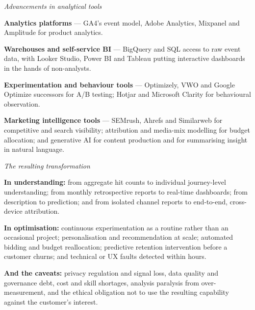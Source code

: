 \begin{qlist}
\textit{Advancements in analytical tools}
\begin{apts}\setcounter{enumi}{9}
\item \textbf{Analytics platforms} --- GA4's event model, Adobe Analytics,
      Mixpanel and Amplitude for product analytics.
\item \textbf{Warehouses and self-service BI} --- BigQuery and SQL access to
      raw event data, with Looker Studio, Power BI and Tableau putting
      interactive dashboards in the hands of non-analysts.
\item \textbf{Experimentation and behaviour tools} --- Optimizely, VWO and
      Google Optimize successors for A/B testing; Hotjar and Microsoft Clarity
      for behavioural observation.
\item \textbf{Marketing intelligence tools} --- SEMrush, Ahrefs and Similarweb
      for competitive and search visibility; attribution and media-mix
      modelling for budget allocation; and generative AI for content production
      and for summarising insight in natural language.
\end{apts}

\textit{The resulting transformation}
\begin{apts}\setcounter{enumi}{13}
\item \textbf{In understanding:} from aggregate hit counts to individual
      journey-level understanding; from monthly retrospective reports to
      real-time dashboards; from description to prediction; and from isolated
      channel reports to end-to-end, cross-device attribution.
\item \textbf{In optimisation:} continuous experimentation as a routine rather
      than an occasional project; personalisation and recommendation at scale;
      automated bidding and budget reallocation; predictive retention
      intervention before a customer churns; and technical or UX faults
      detected within hours.
\item \textbf{And the caveats:} privacy regulation and signal loss, data
      quality and governance debt, cost and skill shortages, analysis paralysis
      from over-measurement, and the ethical obligation not to use the
      resulting capability against the customer's interest.
\end{apts}


\end{qlist}
